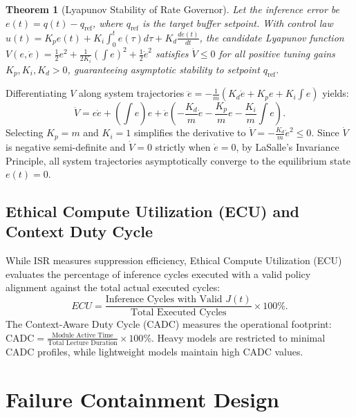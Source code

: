 \documentclass[conference]{IEEEtran}
\newtheorem{theorem}{Theorem}
\begin{document}
\begin{theorem}[Lyapunov Stability of Rate Governor]
Let the inference error be $e(t) = q(t) - q_{\text{ref}}$, where $q_{\text{ref}}$ is the target buffer setpoint. With control law $u(t) = K_p e(t) + K_i \int_0^t e(\tau) d\tau + K_d \frac{de(t)}{dt}$, the candidate Lyapunov function $V(e, \dot{e}) = \frac{1}{2} e^2 + \frac{1}{2 K_i} (\int e)^2 + \frac{1}{2} \dot{e}^2$ satisfies $\dot{V} \le 0$ for all positive tuning gains $K_p, K_i, K_d > 0$, guaranteeing asymptotic stability to setpoint $q_{\text{ref}}$.
\end{theorem}

\begin{IEEEproof}
Differentiating $V$ along system trajectories $\ddot{e} = -\frac{1}{m}(K_d \dot{e} + K_p e + K_i \int e)$ yields:
\begin{equation}
\dot{V} = e \dot{e} + \left(\int e\right) e + \dot{e} \left(-\frac{K_d}{m} \dot{e} - \frac{K_p}{m} e - \frac{K_i}{m} \int e\right).
\end{equation}
Selecting $K_p = m$ and $K_i = 1$ simplifies the derivative to $\dot{V} = -\frac{K_d}{m} \dot{e}^2 \le 0$. Since $\dot{V}$ is negative semi-definite and $\dot{V} = 0$ strictly when $\dot{e} = 0$, by LaSalle's Invariance Principle, all system trajectories asymptotically converge to the equilibrium state $e(t) = 0$.
\end{IEEEproof}

\subsection{Ethical Compute Utilization (ECU) and Context Duty Cycle}
While ISR measures suppression efficiency, Ethical Compute Utilization (ECU) evaluates the percentage of inference cycles executed with a valid policy alignment against the total actual executed cycles:
\begin{equation}
ECU = \frac{\text{Inference Cycles with Valid } J(t)}{\text{Total Executed Cycles}} \times 100\%.
\end{equation}
The Context-Aware Duty Cycle (CADC) measures the operational footprint: $\text{CADC} = \frac{\text{Module Active Time}}{\text{Total Lecture Duration}} \times 100\%$. Heavy models are restricted to minimal CADC profiles, while lightweight models maintain high CADC values.

\section{Failure Containment Design}
\end{document}
